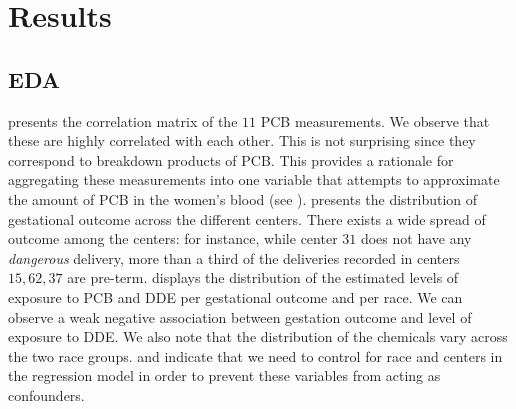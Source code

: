 \documentclass[10pt]{jmlr}%
\begin{document}
\section{Results}
\label{sec:results}

\subsection{EDA}

 presents the correlation matrix of the $11$ PCB measurements. We observe that these are highly correlated with each other. This is not surprising since they correspond to breakdown products of PCB. This provides a rationale for aggregating these measurements into one variable that attempts to approximate the amount of PCB in the women's blood (see ).  presents the distribution of gestational outcome across the different centers. There exists a wide spread of outcome among the centers: for instance, while center $31$ does not have any \textit{dangerous} delivery, more than a third of the deliveries recorded in centers $15, 62, 37$ are pre-term.  displays the distribution of the estimated levels of exposure to PCB and DDE per gestational outcome and per race. We can observe a weak negative association between gestation outcome and level of exposure to DDE. We also note that the distribution of the chemicals vary across the two race groups.  and  indicate that we need to control for race and centers in the regression model in order to prevent these variables from acting as confounders.


\end{document}
